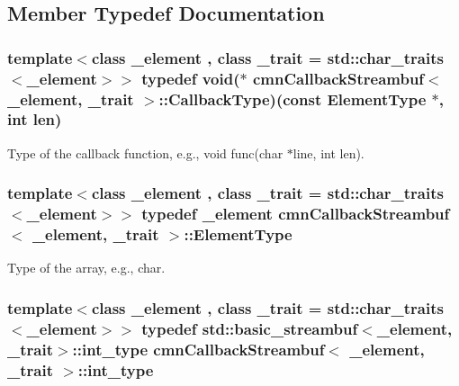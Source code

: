 \subsection{Member Typedef Documentation}
\hypertarget{classcmn_callback_streambuf_aa8a57c63e583b464a5ef66b3d1dd8117}{
\subsubsection[{Callback\-Type}]{\setlength{\rightskip}{0pt plus 5cm}template$<$class \-\_\-element , class \-\_\-trait  = std\-::char\-\_\-traits$<$\-\_\-element$>$$>$ typedef void($\ast$ {\bf cmn\-Callback\-Streambuf}$<$ \-\_\-element, \-\_\-trait $>$\-::Callback\-Type)(const {\bf Element\-Type} $\ast$, int len)}}\label{classcmn_callback_streambuf_aa8a57c63e583b464a5ef66b3d1dd8117}
Type of the callback function, e.\-g., void func(char $\ast$line, int len). \hypertarget{classcmn_callback_streambuf_a3f220172226bbffc7cebefa8d458823a}{
\subsubsection[{Element\-Type}]{\setlength{\rightskip}{0pt plus 5cm}template$<$class \-\_\-element , class \-\_\-trait  = std\-::char\-\_\-traits$<$\-\_\-element$>$$>$ typedef \-\_\-element {\bf cmn\-Callback\-Streambuf}$<$ \-\_\-element, \-\_\-trait $>$\-::{\bf Element\-Type}}}\label{classcmn_callback_streambuf_a3f220172226bbffc7cebefa8d458823a}
Type of the array, e.\-g., char. \hypertarget{classcmn_callback_streambuf_a9599d576e1867902844cb4b5bf3150e8}{
\subsubsection[{int\-\_\-type}]{\setlength{\rightskip}{0pt plus 5cm}template$<$class \-\_\-element , class \-\_\-trait  = std\-::char\-\_\-traits$<$\-\_\-element$>$$>$ typedef std\-::basic\-\_\-streambuf$<$\-\_\-element, \-\_\-trait$>$\-::{\bf int\-\_\-type} {\bf cmn\-Callback\-Streambuf}$<$ \-\_\-element, \-\_\-trait $>$\-::{\bf int\-\_\-type}}}\label{classcmn_callback_streambuf_a9599d576e1867902844cb4b5bf3150e8}


